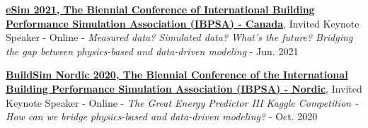 \documentclass[10pt,a4paper]{article}
\begin{document}
\begin{small}
\begin{etaremune}
\item
\textbf{\href{http://esim2020.sala.ubc.ca/}{eSim 2021, The Biennial Conference of International Building Performance Simulation Association (IBPSA) - Canada}}, Invited Keynote Speaker - Online - \emph{Measured data? Simulated data? What's the future? Bridging the gap between physics-based and data-driven modeling} - Jun. 2021%
\item
 \textbf{\href{https://buildsimnordic2020.ibpsa-nordic.org/wp-content/uploads/2020/10/BuildSim-Nordic-2020_Programme_v5.pdf}{BuildSim Nordic 2020, The Biennial Conference of the International Building Performance Simulation Association (IBPSA) - Nordic}}, Invited Keynote Speaker - Online - \emph{The Great Energy Predictor III Kaggle Competition - How can we bridge physics-based and data-driven modeling?} - Oct. 2020%

\end{etaremune}


\end{small}
\end{document}
